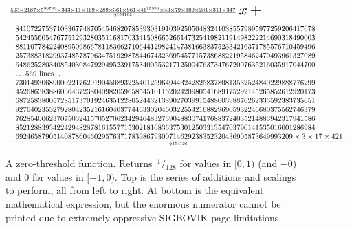 \documentclass[twocolumn]{article}
\newcommand\sfrac[2]{\!{}\,^{#1}\!/{}\!_{#2}}
\begin{document}
\begin{figure}[tp]
\scalebox{2}{$$=$$}
\[
\begin{array}{l}
\frac{593 \times{} 2187 \times{} 5^{30793} \times{} 343 \times{} 11 \times{} 169 \times{} 289 \times{} 361 \times{} 961 \times{} 41^{15396} \times{} 43 \times{} 79 \times{} 109 \times{} 281 \times{} 311 \times{} 347}{2^{154102}}\scalebox{2}{$\,x\,+$} \\[1em]
\frac{\begin{array}{r@{}l}
\, & 84107227537103367748705454682078539303191039250504832410385579895977259206417678 \\
\, & 54245560547677512932803511681703341508665266147325419821191498222214690318490003 \\
\, & 88110778422408950986678118366271064412982414738166383752334216371785576710459496 \\
\, & 25738831829937485787963475192987844674323695457715738688221958462470493961327089 \\
\, & 64862528034085403084792949523917534005532171250047637347672007635216035917044700 \\
\, & \ldots 569\ \mathrm{lines} \ldots \\
\, & 73014930689000221762919045089322540125964944324282583780813532524840229888776299 \\
\, & 45268638388603643723804098205965854510116202420980541689175292145265852612920173 \\
\, & 68725838005728517370192463512280524432138902703991548800398876262333592383735651 \\
\, & 92764023532792804235216160403774463302046032255421688296905932246680375562746379 \\
\, & 76285400623707503241570527062342946483273904883074176883724035214883942317941586 \\
\, & 85212883934224294828781615577153021816836375301250331354703790141535016001286984 \\
\, & 69246587905140878604602957637178398679300714629238352320436905873649993209 \times{} 3 \times{} 17 \times{} 421 \\
\end{array}}{2^{154126}} \\
\end{array}
\]
\caption{
  A zero-threshold function. Returns $\sfrac{1}{128}$ for values in $[0, 1)$ (and $-0$) and $0$ for values in $[-1, 0)$.
      Top is the series of additions and scalings to perform, all from left to right. At bottom
      is the equivalent mathematical expression, but the enormous numerator cannot be printed due to
      extremely oppressive SIGBOVIK page limitations.
  } \label{fig:zerothreshold}
\end{figure}
\end{document}
